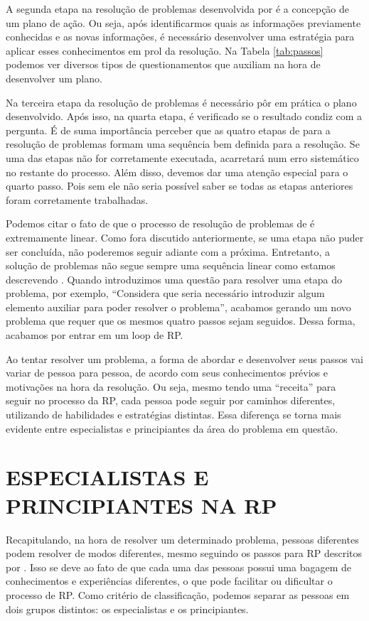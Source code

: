 A segunda etapa na resolução de problemas desenvolvida por \cite{Polya2006} é a concepção de um plano de ação. Ou seja, após identificarmos quais as informações previamente conhecidas e as novas informações, é necessário desenvolver uma estratégia para aplicar esses conhecimentos em prol da resolução. Na Tabela \ref{tab:passos} podemos ver diversos tipos de questionamentos que auxiliam na hora de desenvolver um plano. 

Na terceira etapa da resolução de problemas é necessário pôr em prática o plano desenvolvido. Após isso, na quarta etapa, é verificado se o resultado condiz com a pergunta. É de suma importância perceber que as quatro etapas de  para a resolução de problemas formam uma sequência bem definida para a resolução. Se uma das etapas não for corretamente executada, acarretará num erro sistemático no restante do processo. Além disso, devemos dar uma atenção especial para o quarto passo. Pois sem ele não seria possível saber se todas as etapas anteriores foram corretamente trabalhadas. 

Podemos citar o fato de que o processo de resolução de problemas de  é extremamente linear. Como fora discutido anteriormente, se uma etapa não puder ser concluída, não poderemos seguir adiante com a próxima. Entretanto, a solução de problemas não segue sempre uma sequência linear como estamos descrevendo \cite{Echeverria1998}. Quando introduzimos uma questão para resolver uma etapa do problema, por exemplo, “Considera que seria necessário introduzir algum elemento auxiliar para poder resolver o problema”, acabamos gerando um novo problema que requer que os mesmos quatro passos sejam seguidos. Dessa forma, acabamos por entrar em um loop de RP. 

Ao tentar resolver um problema, a forma de abordar e desenvolver seus passos vai variar de pessoa para pessoa, de acordo com seus conhecimentos prévios e motivações na hora da resolução. Ou seja, mesmo tendo uma “receita” para seguir no processo da RP, cada pessoa pode seguir por caminhos diferentes, utilizando de habilidades e estratégias distintas. Essa diferença se torna mais evidente entre especialistas e principiantes da área do problema em questão. 
\section{ESPECIALISTAS E PRINCIPIANTES NA RP}
Recapitulando, na hora de resolver um determinado problema, pessoas diferentes podem resolver de modos diferentes, mesmo seguindo os passos para RP descritos por . Isso se deve ao fato de que cada uma das pessoas possui uma bagagem de conhecimentos e experiências diferentes, o que pode facilitar ou dificultar o processo de RP. Como critério de classificação, podemos separar as pessoas em dois grupos distintos: os especialistas e os principiantes. 

